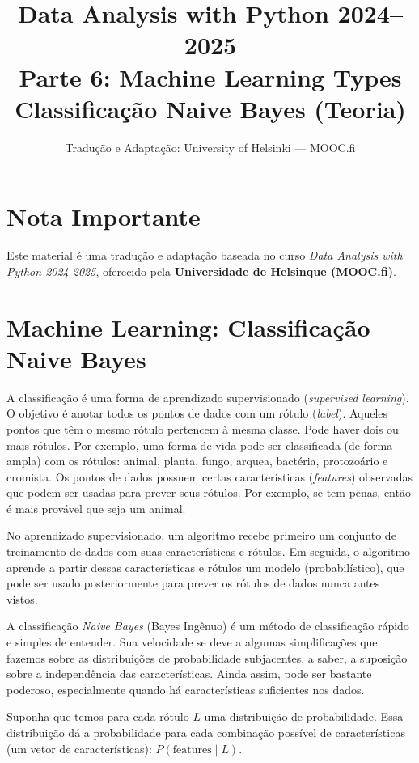 \documentclass[11pt,a4paper]{article}
\title{\textbf{Data Analysis with Python 2024--2025}\\Parte 6: Machine Learning Types\\\large Classificação Naive Bayes (Teoria)}
\author{Tradução e Adaptação: University of Helsinki --- MOOC.fi}
\date{}
\begin{document}
\maketitle

\section*{Nota Importante}
Este material é uma tradução e adaptação baseada no curso \textit{Data Analysis with Python 2024-2025}, oferecido pela \textbf{Universidade de Helsinque (MOOC.fi)}.

\tableofcontents
\newpage

\section{Machine Learning: Classificação Naive Bayes}

A classificação é uma forma de aprendizado supervisionado (\emph{supervised learning}). O objetivo é anotar todos os pontos de dados com um rótulo (\emph{label}). Aqueles pontos que têm o mesmo rótulo pertencem à mesma classe. Pode haver dois ou mais rótulos. Por exemplo, uma forma de vida pode ser classificada (de forma ampla) com os rótulos: animal, planta, fungo, arquea, bactéria, protozoário e cromista. Os pontos de dados possuem certas características (\emph{features}) observadas que podem ser usadas para prever seus rótulos. Por exemplo, se tem penas, então é mais provável que seja um animal.

No aprendizado supervisionado, um algoritmo recebe primeiro um conjunto de treinamento de dados com suas características e rótulos. Em seguida, o algoritmo aprende a partir dessas características e rótulos um modelo (probabilístico), que pode ser usado posteriormente para prever os rótulos de dados nunca antes vistos.

A classificação \emph{Naive Bayes} (Bayes Ingênuo) é um método de classificação rápido e simples de entender. Sua velocidade se deve a algumas simplificações que fazemos sobre as distribuições de probabilidade subjacentes, a saber, a suposição sobre a independência das características. Ainda assim, pode ser bastante poderoso, especialmente quando há características suficientes nos dados.

Suponha que temos para cada rótulo $L$ uma distribuição de probabilidade. Essa distribuição dá a probabilidade para cada combinação possível de características (um vetor de características): $P(\text{features} \mid L)$.
\end{document}
